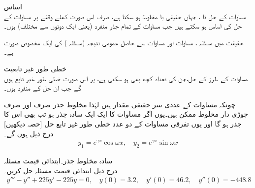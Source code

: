  \quad اساس\\
مساوات  کے حل  تا ، جہاں  حقیقی یا مخلوط ہو سکتا ہے، صرف اس صورت کھلے وقفے پر مساوات  کے حل کی اساس ہو سکتے ہیں جب مساوات  کے تمام  جذر منفرد (یعنی ایک دونوں سے مختلف) ہوں۔

حقیقت میں مسئلہ ، مساوات  اور مساوات  سے حاصل عمومی نتیجہ (مسئلہ ) کی ایک مخصوص صورت ہے۔

 \quad خطی طور غیر تابعیت\\
مساوات  کے  طرز کے حل،جن کی تعداد کچھ بھی ہو سکتی ہے،   پر اس صورت خطی طور غیر تابع ہوں گے جب ان حل کے   منفرد ہوں۔

چونکہ مساوات  کے عددی سر حقیقی مقدار ہیں لہٰذا مخلوط جذر صرف اور صرف جوڑی دار مخلوط ممکن ہیں۔یوں اگر مساوات  کا ایک ایک سادہ جذر  ہو تب  بھی اس کا جذر ہو گا اور یوں تفرقی مساوات کے دو عدد خطی طور غیر تابع حل [حصہ  دیکھیں] درج ذیل ہوں گے۔
\begin{align*}
y_1=e^{\gamma x} \cos \omega x, \quad y_2=e^{\gamma x} \sin \omega x
\end{align*}

\quad سادہ مخلوط جذر۔ابتدائی قیمت مسئلہ\\
درج ذیل ابتدائی قیمت مسئلہ حل کریں۔
\begin{align*}
y'''-y''+225y'-225y=0, \quad y(0)=3.2, \quad y'(0)=46.2, \quad y''(0)=-448.8
\end{align*}

